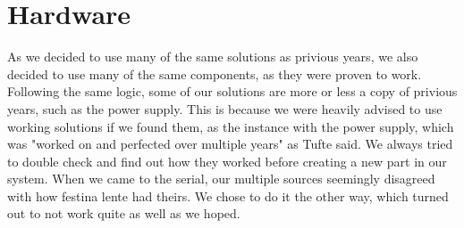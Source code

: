 \section {Hardware}

As we decided to use many of the same solutions as privious years, we also decided to use many of the same components, as they were proven to work. Following the same logic, some of our solutions are more or less a copy of privious years, such as the power supply. This is because we were heavily advised to use working solutions if we found them, as the instance with the power supply, which was "worked on and perfected over multiple years" as Tufte said. We always tried to double check and find out how they worked before creating a new part in our system. When we came to the serial, our multiple sources seemingly disagreed with how festina lente had theirs. We chose to do it the other way, which turned out to not work quite as well as we hoped.

